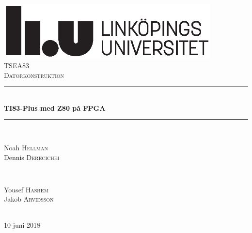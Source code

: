 \documentclass[main.tex]{subfiles}
\begin{document}
\thispagestyle{empty}
\begin{center}
    \includegraphics[height=3cm]{img/liu.eps}\\[2cm]

    \textsc{\Large TSEA83}\\[1cm]
    \textsc{\large Datorkonstruktion}\\[2cm]
    
    \rule{\linewidth}{0.5mm} \\[0.8cm]
    { \huge \bfseries TI83-Plus med Z80 på FPGA}\\[0.6cm]
    \rule{\linewidth}{0.5mm} \\[3cm]
     
    \begin{minipage}{0.4\textwidth}
        \begin{flushleft} \large
        Noah \textsc{Hellman}\\
        Dennis \textsc{Derecichei}
        \end{flushleft}
    \end{minipage}
    ~
    \begin{minipage}{0.4\textwidth}
        \begin{flushright} \large
        Yousef \textsc{Hashem}\\
        Jakob \textsc{Arvidsson}
        \end{flushright}
    \end{minipage}\\[4.2cm]
    
    {\large 10 juni 2018}\\[4cm] %
\end{center}
\vfill
\end{document}
